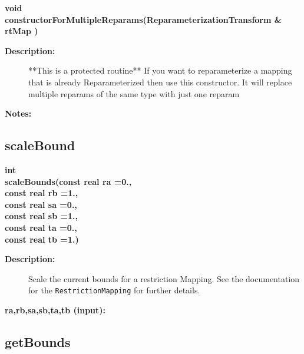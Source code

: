 \begin{flushleft} \textbf{%
void  \\ 
\settowidth{\ReparameterizationTransformIncludeArgIndent}{constructorForMultipleReparams(}%
constructorForMultipleReparams(ReparameterizationTransform \& rtMap )
}\end{flushleft}
\begin{description}
\item[{\bf Description:}]  **This is a protected routine**
   If you want to reparameterize a mapping that is already Reparameterized then use this
   constructor.  It will replace multiple reparams of the same type with just one reparam
\item[{\bf Notes:}] 
   
\end{description}
\subsection{scaleBound}
 
\begin{flushleft} \textbf{%
int  \\ 
\settowidth{\ReparameterizationTransformIncludeArgIndent}{scaleBounds(}%
scaleBounds(const real ra =0.,\\ 
\hspace{\ReparameterizationTransformIncludeArgIndent}const real rb =1., \\ 
\hspace{\ReparameterizationTransformIncludeArgIndent}const real sa =0.,\\ 
\hspace{\ReparameterizationTransformIncludeArgIndent}const real sb =1.,\\ 
\hspace{\ReparameterizationTransformIncludeArgIndent}const real ta =0.,\\ 
\hspace{\ReparameterizationTransformIncludeArgIndent}const real tb   =1.)
}\end{flushleft}
\begin{description}
\item[{\bf Description:}]  
    Scale the current bounds for a restriction Mapping. See the documentation for the
   {\tt RestrictionMapping} for further details.
\item[{\bf ra,rb,sa,sb,ta,tb (input):}]  
\end{description}
\subsection{getBounds}
 
